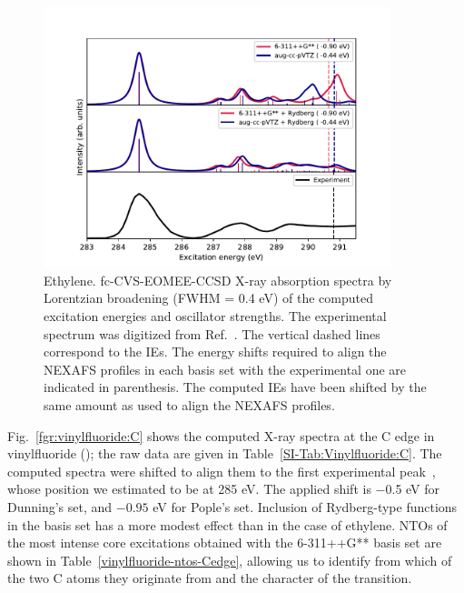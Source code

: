 \documentclass[journal=jctcce,manuscript=article]{achemso}
\begin{document}
\begin{figure}
  \includegraphics[width=0.9\textwidth]{Spectra/C2H4.pdf}
  \caption{Ethylene. fc-CVS-EOMEE-CCSD X-ray absorption spectra by  Lorentzian broadening (FWHM = 0.4 eV) of the computed excitation energies and oscillator strengths. The  experimental spectrum was digitized from Ref.~. The vertical dashed lines correspond to the IEs.
The energy shifts 
required to align the NEXAFS profiles in each basis set with the
experimental one are indicated in parenthesis. The computed IEs have been shifted by the same amount as used to align the NEXAFS profiles.
\label{fgr:ethylene}}
\end{figure}



Fig.~\ref{fgr:vinylfluoride:C} shows the computed X-ray spectra 
at the C edge in vinylfluoride (); the raw data are given in Table~\ref{SI-Tab:Vinylfluoride:C}.
The computed spectra were shifted to align them to the first experimental peak~\cite{NEXAFS_C2H4_CH2CHF_Exp}, whose position we estimated to be at 285 eV. The applied shift is $-$0.5 eV
for Dunning's set, and $-0.95$ eV for Pople's set. 
Inclusion of Rydberg-type functions in the basis set has a more 
modest effect than in the case of ethylene.
NTOs of the most intense core excitations obtained with the
6-311++G** basis set are shown in Table~\ref{vinylfluoride-ntos-Cedge}, 
allowing us to identify from which of the two C atoms they originate from and the character of the transition. 
\end{document}
